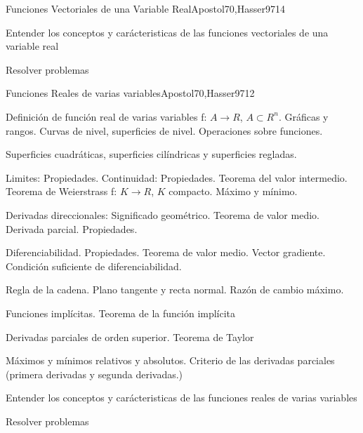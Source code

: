 \begin{syllabus}
\begin{unit}{Funciones Vectoriales de una Variable Real}{Apostol70,Hasser97}{14}
   \begin{learningoutcomes}
         \item  Entender los conceptos y carácteristicas de las funciones vectoriales de una variable real
         \item  Resolver problemas
   \end{learningoutcomes}
\end{unit}

\begin{unit}{Funciones Reales de varias variables}{Apostol70,Hasser97}{12}
   \begin{topics}
	\item  Definición de función real de varias variables f: $A \rightarrow R$, $A \subset R^n$. Gráficas y rangos. Curvas de nivel, superficies de nivel. Operaciones sobre funciones.
	\item  Superficies cuadráticas, superficies cilíndricas y superficies regladas.
	\item  Limites: Propiedades. Continuidad: Propiedades. Teorema del valor intermedio. Teorema de Weierstrass f: $K \rightarrow R$, $K$ compacto. Máximo y mínimo.
	\item  Derivadas direccionales: Significado geométrico. Teorema de valor medio. Derivada parcial. Propiedades.
	\item  Diferenciabilidad. Propiedades. Teorema de valor medio. Vector gradiente. Condición suficiente de diferenciabilidad.
	\item  Regla de la cadena. Plano tangente y recta normal. Razón de cambio máximo.
	\item Funciones implícitas. Teorema de la función implícita
	\item Derivadas parciales de orden superior. Teorema de Taylor
	\item Máximos y mínimos relativos y absolutos. Criterio de las derivadas parciales (primera derivadas y segunda derivadas.)
   \end{topics}

   \begin{learningoutcomes}
         \item  Entender los conceptos y carácteristicas de las funciones reales de varias variables
         \item  Resolver problemas
   \end{learningoutcomes}
\end{unit}


\end{syllabus}
